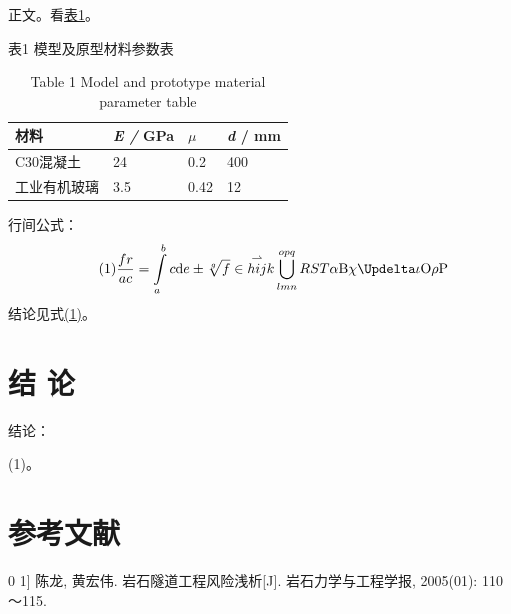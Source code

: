 \documentclass[UTF8]{ctexart}
\begin{document}
正文\cite{bib1}。看{\hyperref[ref-02]{表1}}。

{\centering 表1  模型及原型材料参数表\label{ref-02}

\par}
\begin{table}
\caption{Table 1  Model and prototype material parameter table}
\begin{tabularx}{\textwidth}{|p{}|p{}|p{}|p{}|} \hline 
材料 & \textit{E / }GPa & ${\mu}$ & \textit{d} / mm\\\hline 
C30混凝土 & 24 & 0.2 & 400\\\hline 
工业有机玻璃 & 3.5 & 0.42 & 12\\\hline 
\end{tabularx}
\end{table}
行间公式：
\begin{equation}
\tag{1}
\label{ref-03}\frac{fr}{ac}=\int \limits_{a}^{b}c\mathrm{d}e\pm \sqrt[g]{f}\in \overset{\rightharpoonup }{hij}k\bigcup \limits_{lmn}^{opq}RST\mathit{\alpha }\mathrm{B }\mathit{\chi }\Updelta \iota \mathrm{O }\rho \mathrm{P }
\end{equation}
结论见式{\hyperref[ref-03]{(1)}}。

\section{结  论\label{mark-2}}

结论：

(1)。

\section{参考文献}


\begin{thebibliography}{0}
\bibitem[bib-1]{}{[}1{]}	陈龙, 黄宏伟. 岩石隧道工程风险浅析{[}J{]}. 岩石力学与工程学报, 2005(01): 110～115.
\end{thebibliography}




\end{document}
